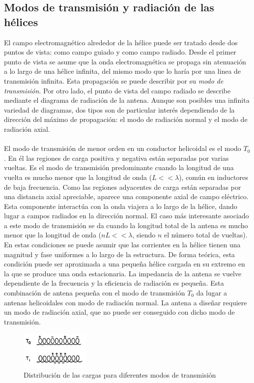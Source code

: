 \documentclass[12pt]{article}
\begin{document}
\subsection{Modos de transmisión y radiación de las hélices}
El campo electromagnético alrededor de la hélice puede ser tratado desde dos puntos de vista: como campo guiado y como campo radiado. Desde el primer punto de vista se asume que la onda electromagnética se propaga sin atenuación a lo largo de una hélice infinita, del mismo modo que lo haría por una linea de transmisión infinita. Esta propagación se puede describir por su \textit{modo de transmisión}. Por otro lado, el punto de vista del campo radiado se describe mediante el diagrama de radiación de la antena. Aunque son posibles una infinita variedad de diagramas, dos tipos son de particular interés dependiendo de la dirección del máximo de propagación: el modo de radiación normal y el modo de radiación axial.\\\\
El modo de transmisión de menor orden en un conductor helicoidal es el modo $T_{0}$. En él las regiones de carga positiva y negativa están separadas por varias vueltas. Es el modo de transmisión predominante cuando la longitud de una vuelta es mucho menor que la longitud de onda ($L<<\lambda$), común en inductores de baja frecuencia. Como las regiones adyacentes de carga están separadas por una distancia axial apreciable, aparece una componente axial de campo eléctrico. Esta componente interactúa con la onda viajera a lo largo de la hélice, dando lugar a campos radiados en la dirección normal. El caso más interesante asociado a este modo de transmisión se da cuando la longitud total de la antena es mucho menor que la longitud de onda ($nL<<\lambda$, siendo $n$ el número total de vueltas). En estas condiciones se puede asumir que las corrientes en la hélice tienen una magnitud y fase uniformes a lo largo de la estructura. De forma teórica, esta condición puede ser aproximada a una pequeña hélice cargada en su extremo en la que se produce una onda estacionaria. La impedancia de la antena se vuelve dependiente de la frecuencia y la eficiencia de radiación es pequeña. Esta combinación de antena pequeña con el modo de transmisión $T_{0}$ da lugar a antenas helicoidales con modo de radiación normal. La antena a diseñar requiere un modo de radiación axial, que no puede ser conseguido con dicho modo de transmisión.\\

\begin{figure}[h]
	\centering
	\includegraphics[width=0.3\textwidth]{modos.png}
	\caption{Distribución de las cargas para diferentes modos de transmisión}
	\label{fig:modes}
\end{figure}
\end{document}
